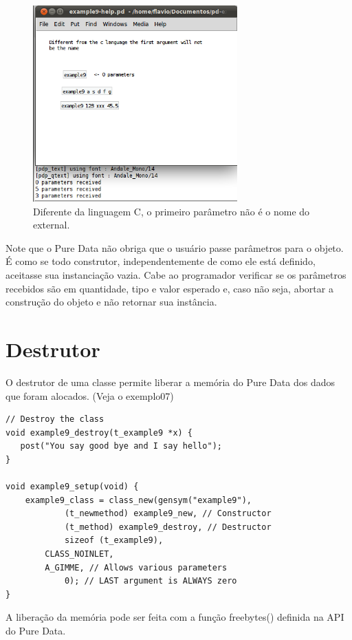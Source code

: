 \documentclass[10pt,a4paper]{report}
\begin{document}
\begin{figure}[h!]
	\centering
	\includegraphics[width=0.7\textwidth]{example9}
	\caption{Diferente da linguagem C, o primeiro parâmetro não é o nome do external.}
\end{figure}

Note que o Pure Data não obriga que o usuário passe parâmetros para o objeto. É como se todo construtor, independentemente de como ele está definido, aceitasse sua instanciação vazia. Cabe ao programador verificar se os parâmetros recebidos são em quantidade, tipo e valor esperado e, caso não seja, abortar a construção do objeto e não retornar sua instância.

\section{Destrutor}
O destrutor de uma classe permite liberar a memória do Pure Data dos dados que foram alocados. (Veja o exemplo07)
\begin{lstlisting}
// Destroy the class
void example9_destroy(t_example9 *x) {
   post("You say good bye and I say hello");
}

void example9_setup(void) {
    example9_class = class_new(gensym("example9"),
            (t_newmethod) example9_new, // Constructor
            (t_method) example9_destroy, // Destructor
            sizeof (t_example9),
	    CLASS_NOINLET,
	    A_GIMME, // Allows various parameters
            0); // LAST argument is ALWAYS zero
}

\end{lstlisting}

A liberação da memória pode ser feita com a função freebytes() definida na API do Pure Data.
\end{document}
